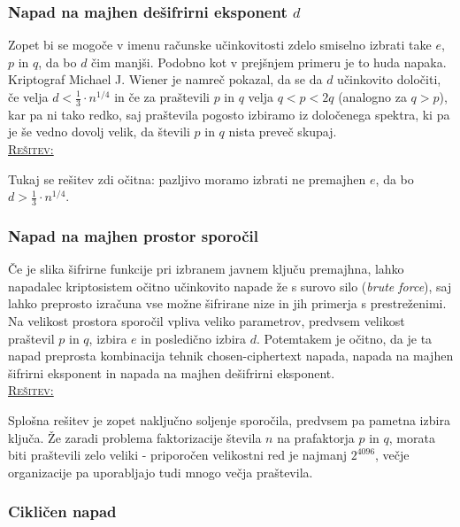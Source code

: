 \documentclass[a4paper, 12pt]{article} %
\newenvironment{matematika}[1]{
\textcolor{bostonuniversityred}{\underline{\textsc{#1:}}}
}{
}
\begin{document}
\subsubsection{Napad na majhen dešifrirni eksponent $d$}

Zopet bi se mogoče v imenu računske učinkovitosti zdelo smiselno izbrati take $e$, $p$ in $q$, da bo $d$ čim manjši. Podobno kot v prejšnjem primeru je to huda napaka. Kriptograf Michael J. Wiener je namreč pokazal, da se da $d$ učinkovito določiti, če velja $d < \frac{1}{3} \cdot n^{1/4}$ in če za praštevili $p$ in $q$ velja $q < p < 2q$ (analogno za $q > p$), kar pa ni tako redko, saj praštevila pogosto izbiramo iz določenega spektra, ki pa je še vedno dovolj velik, da števili $p$ in $q$ nista preveč skupaj. \\

\begin{matematika}{Rešitev}
Tukaj se rešitev zdi očitna: pazljivo moramo izbrati ne premajhen $e$, da bo $d > \frac{1}{3} \cdot n^{1/4}$.
\end{matematika}

\subsubsection{Napad na majhen prostor sporočil}

Če je slika šifrirne funkcije pri izbranem javnem ključu premajhna, lahko napadalec kriptosistem očitno učinkovito napade že s surovo silo (\emph{brute force}), saj lahko preprosto izračuna vse možne šifrirane nize in jih primerja s prestreženimi. Na velikost prostora sporočil vpliva veliko parametrov, predvsem velikost praštevil $p$ in $q$, izbira $e$ in posledično izbira $d$. Potemtakem je očitno, da je ta napad preprosta kombinacija tehnik chosen-ciphertext napada, napada na majhen šifrirni eksponent in napada na majhen dešifrirni eksponent. \\

\begin{matematika}{Rešitev}
Splošna rešitev je zopet naključno soljenje sporočila, predvsem pa pametna izbira ključa. Že zaradi problema faktorizacije števila $n$ na prafaktorja $p$ in $q$, morata biti praštevili zelo veliki - priporočen velikostni red je najmanj $2^{4096}$, večje organizacije pa uporabljajo tudi mnogo večja praštevila.
\end{matematika}

\subsubsection{Cikličen napad}
\end{document}
